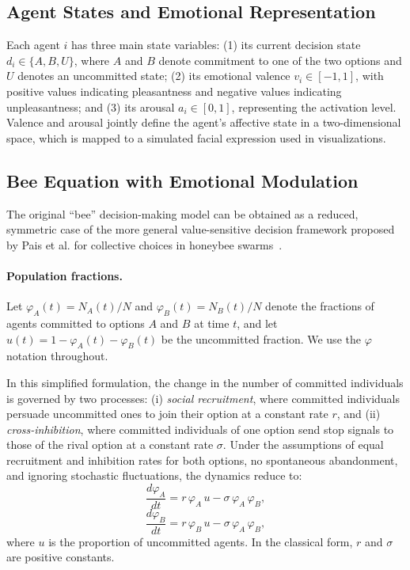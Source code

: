 \documentclass[a4paper,twoside]{article}
\begin{document}
\subsection{Agent States and Emotional Representation}

Each agent $i$ has three main state variables: (1) its current decision state $d_i \in \{A,B,U\}$, where $A$ and $B$ denote commitment to one of the two options and $U$ denotes an uncommitted state; (2) its emotional valence $v_i \in [-1,1]$, with positive values indicating pleasantness and negative values indicating unpleasantness; and (3) its arousal $a_i \in [0,1]$, representing the activation level. Valence and arousal jointly define the agent's affective state in a two-dimensional space, which is mapped to a simulated facial expression used in visualizations.


\subsection{Bee Equation with Emotional Modulation}

The original ``bee'' decision-making model can be obtained as a reduced, symmetric case of the more general value-sensitive decision framework proposed by Pais et al. for collective choices in honeybee swarms~\cite{pais2013mechanism}. 

\paragraph{Population fractions.}
Let $\varphi_A(t)=N_A(t)/N$ and $\varphi_B(t)=N_B(t)/N$ denote the fractions of agents committed to options $A$ and $B$ at time $t$, and let $u(t)=1-\varphi_A(t)-\varphi_B(t)$ be the uncommitted fraction. We use the $\varphi$ notation throughout.

In this simplified formulation, the change in the number of committed individuals is governed by two processes: 
(i) \emph{social recruitment}, where committed individuals persuade uncommitted ones to join their option at a constant rate $r$, and 
(ii) \emph{cross-inhibition}, where committed individuals of one option send stop signals to those of the rival option at a constant rate $\sigma$. 
Under the assumptions of equal recruitment and inhibition rates for both options, no spontaneous abandonment, and ignoring stochastic fluctuations, the dynamics reduce to:
\begin{equation}
\frac{d\varphi_A}{dt} = r\,\varphi_A \, u - \sigma\,\varphi_A\,\varphi_B,
\end{equation}
\begin{equation}
\frac{d\varphi_B}{dt} = r\,\varphi_B \, u - \sigma\,\varphi_A\,\varphi_B,
\end{equation}
where $u$ is the proportion of uncommitted agents. 
In the classical form, $r$ and $\sigma$ are positive constants.
\end{document}
